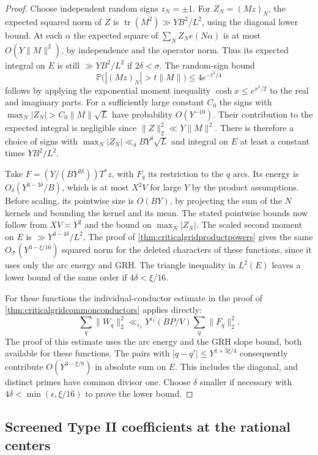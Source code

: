 \documentclass[11pt,a4paper]{article}
\numberwithin{equation}{section}
\begin{document}
\begin{proof}
Choose independent random signs $z_N=\pm1$.
For $Z_N=(Mz)_N$, the expected squared norm of $Z$ is
$\operatorname{tr}(M^2)\gg YB^2/L^2$, using the diagonal lower
bound. At each $\alpha$ the expected square of
$\sum_N Z_Ne(N\alpha)$ is at most $O(Y\|M\|^2)$, by
independence and the operator norm. Thus its expected integral
on $E$ is still $\gg YB^2/L^2$ if $2\delta<\sigma$.
The random-sign bound
\[
 \mathbb P\bigl(|(Mz)_N|>t\|M\|\bigr)\le 4 e^{-t^2/4}
\]
follows by applying the exponential moment inequality
$\cosh x\le e^{x^2/2}$ to the real and imaginary parts.
For a sufficiently large constant $C_0$ the signs with
$\max_N |Z_N|>C_0\|M\|\sqrt L$ have probability $O(Y^{-10})$.
Their contribution to the expected integral is negligible
since $\|Z\|_2^2\ll Y\|M\|^2$. There is therefore a choice
of signs with $\max_N |Z_N|\ll_\delta B Y^\delta\sqrt L$
and integral on $E$ at least a constant times $YB^2/L^2$.

Take $F=(Y/(B Y^{2\delta}))T^*z$, with $F_q$ its restriction
to the $q$ arcs. Its energy is $O_\delta(Y^{3-3\delta}/B)$,
which is at most $X^2 V$ for large $Y$ by the product assumptions.
Before scaling, its pointwise size is $O(BY)$, by projecting
the sum of the $N$ kernels and bounding the kernel and its mean.
The stated pointwise bounds now follow from $XV\asymp Y^2$
and the bound on $\max_N |Z_N|$.
The scaled second moment on $E$ is $\gg Y^{3-4\delta}/L^2$.
The proof of \cref{thm:criticalgridproductpowers} gives the
same $O_{\mathcal T}(Y^{3-\xi/16})$ squared norm for the
deleted characters of these functions, since it uses only
the arc energy and GRH. The triangle inequality in $L^2(E)$
leaves a lower bound of the same order if $4\delta<\xi/16$.

For these functions the individual-conductor estimate in the
proof of \cref{thm:criticalgridcommonconductors} applies directly:
\[
 \sum_q\|W_q\|_2^2
 \ll_{\epsilon_1}Y^{\epsilon_1}(BP/V)\sum_q\|F_q\|_2^2.
\]
The proof of this estimate uses the arc energy and the GRH
slope bound, both available for these functions.
The pairs with $|q-q'|\le Y^{1+3\xi/4}$ consequently contribute
$O(Y^{3-\xi/8})$ in absolute sum on $E$. This includes the
diagonal, and distinct primes have common divisor one.
Choose $\delta$ smaller if necessary with
$4\delta<\min(\epsilon,\xi/16)$ to prove the lower bound.
\end{proof}

\clearpage
\subsection{Screened Type II coefficients at the rational centers}
\end{document}
